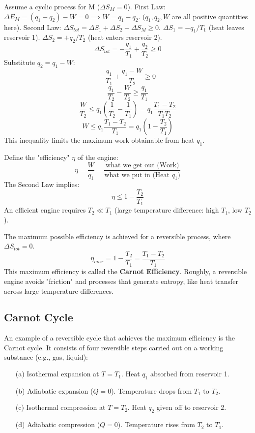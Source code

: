 \documentclass[11pt]{article}
\begin{document}
Assume a cyclic process for M ($\Delta S_M = 0$).
First Law: $\Delta E_M = (q_1 - q_2) - W = 0 \implies W = q_1 - q_2$. ($q_1, q_2, W$ are all positive quantities here).
Second Law: $\Delta S_{tot} = \Delta S_1 + \Delta S_2 + \Delta S_M \ge 0$.
$\Delta S_1 = -q_1/T_1$ (heat leaves reservoir 1).
$\Delta S_2 = +q_2/T_2$ (heat enters reservoir 2).
\[ \Delta S_{tot} = -\frac{q_1}{T_1} + \frac{q_2}{T_2} \ge 0 \]
Substitute $q_2 = q_1 - W$:
\[ -\frac{q_1}{T_1} + \frac{q_1 - W}{T_2} \ge 0 \]
\[ \frac{q_1}{T_2} - \frac{W}{T_2} \ge \frac{q_1}{T_1} \]
\[ \frac{W}{T_2} \le q_1 \left( \frac{1}{T_2} - \frac{1}{T_1} \right) = q_1 \frac{T_1 - T_2}{T_1 T_2} \]
\[ W \le q_1 \frac{T_1 - T_2}{T_1} = q_1 \left( 1 - \frac{T_2}{T_1} \right) \]
This inequality limits the maximum work obtainable from heat $q_1$.

Define the "efficiency" $\eta$ of the engine:
\[ \eta = \frac{W}{q_1} = \frac{\text{what we get out (Work)}}{\text{what we put in (Heat } q_1 \text{)}} \]
The Second Law implies:
\[ \eta \le 1 - \frac{T_2}{T_1} \]
An efficient engine requires $T_2 \ll T_1$ (large temperature difference: high $T_1$, low $T_2$).

The maximum possible efficiency is achieved for a reversible process, where $\Delta S_{tot} = 0$.
\[ \eta_{max} = 1 - \frac{T_2}{T_1} = \frac{T_1 - T_2}{T_1} \]
This maximum efficiency is called the \textbf{Carnot Efficiency}.
Roughly, a reversible engine avoids "friction" and processes that generate entropy, like heat transfer across large temperature differences.

\subsection*{Carnot Cycle}
An example of a reversible cycle that achieves the maximum efficiency is the Carnot cycle. It consists of four reversible steps carried out on a working substance (e.g., gas, liquid):

\begin{enumerate}
    \item[(a)] Isothermal expansion at $T=T_1$. Heat $q_1$ absorbed from reservoir 1.
    \item[(b)] Adiabatic expansion ($Q=0$). Temperature drops from $T_1$ to $T_2$.
    \item[(c)] Isothermal compression at $T=T_2$. Heat $q_2$ given off to reservoir 2.
    \item[(d)] Adiabatic compression ($Q=0$). Temperature rises from $T_2$ to $T_1$.
\end{enumerate}
\end{document}
